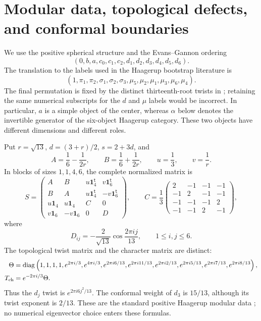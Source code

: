 \section{Modular data, topological defects, and conformal boundaries}
\label{sec:physics-defects}

We use the positive spherical structure and the Evans--Gannon ordering
\[
 (0,b,a,c_0,c_1,c_2,d_1,d_2,d_3,d_4,d_5,d_6).
\]
The translation to the labels used in the Haagerup bootstrap literature is
\[
 (1,\pi_1,\pi_2,\sigma_1,\sigma_2,\sigma_3,
   \mu_5,\mu_2,\mu_1,\mu_3,\mu_6,\mu_4).
\]
The final permutation is fixed by the distinct thirteenth-root twists
in \cite[arXiv version~2, Eq.~(30)]{AHKZ}; retaining the same numerical subscripts for
the $d$ and $\mu$ labels would be incorrect.
In particular, $a$ is a simple object of the center, whereas $\alpha$
below denotes the invertible generator of the six-object Haagerup
category. These two objects have different dimensions and different roles.

Put $r=\sqrt{13}$, $d=(3+r)/2$, $s=2+3d$, and
\[
 A=\frac16-\frac1{2r},\qquad B=\frac16+\frac1{2r},\qquad
 u=\frac13,\qquad v=\frac1r.
\]
In blocks of sizes $1,1,4,6$, the complete normalized matrix is
\begin{equation}
 S=\begin{pmatrix}
 A&B&u\mathbf1_4^{\mathsf t}&v\mathbf1_6^{\mathsf t}\\
 B&A&u\mathbf1_4^{\mathsf t}&-v\mathbf1_6^{\mathsf t}\\
 u\mathbf1_4&u\mathbf1_4&C&0\\
 v\mathbf1_6&-v\mathbf1_6&0&D
 \end{pmatrix},
 \qquad
 C=\frac13\begin{pmatrix}
 2&-1&-1&-1\\-1&2&-1&-1\\-1&-1&-1&2\\-1&-1&2&-1
 \end{pmatrix},
 \label{eq:physics-S}
\end{equation}
where
\begin{equation}
 D_{ij}=-\frac2{\sqrt{13}}\cos\frac{2\pi ij}{13},
 \qquad 1\leq i,j\leq6.
 \label{eq:physics-Sd}
\end{equation}
The topological twist matrix and the character matrix are distinct:
\begin{align}
 \Theta&=\operatorname{diag}\left(
 1,1,1,1,e^{2\pi i/3},e^{4\pi i/3},
 e^{2\pi i6/13},e^{2\pi i11/13},e^{2\pi i2/13},
 e^{2\pi i5/13},e^{2\pi i7/13},e^{2\pi i8/13}\right),\\
 T_{\rm ch}&=e^{-2\pi i/3}\Theta.
 \label{eq:physics-T}
\end{align}
Thus the $d_j$ twist is $e^{2\pi i6j^2/13}$. The conformal weight of
$d_3$ is $15/13$, although its twist exponent is $2/13$.
These are the standard positive Haagerup modular data
\cite{EG}; no numerical eigenvector choice enters these formulas.

